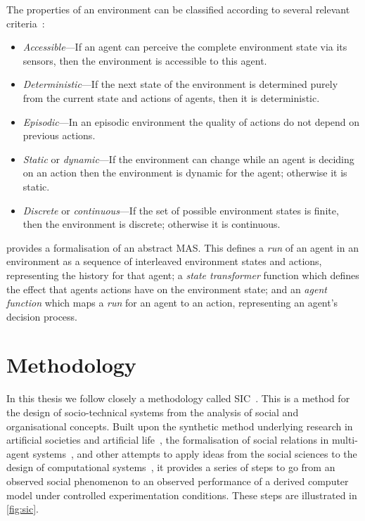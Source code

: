 The properties of an environment can be classified according to several relevant criteria~\citep[p.46]{Russell2003}:
\begin{itemize}
\item \emph{Accessible}---If an agent can perceive the complete environment state via its sensors, then the environment is accessible to this agent.
\item \emph{Deterministic}---If the next state of the environment is determined purely from the current state and actions of agents, then it is deterministic.
\item \emph{Episodic}---In an episodic environment the quality of actions do not depend on previous actions.
\item \emph{Static} or \emph{dynamic}---If the environment can change while an agent is deciding on an action then the environment is dynamic for the agent; otherwise it is static.
\item \emph{Discrete} or \emph{continuous}---If the set of possible environment states is finite, then the environment is discrete; otherwise it is continuous.
\end{itemize}

\citet[pp.31--32]{Wooldridge2002} provides a formalisation of an abstract \ac{MAS}. This defines a \emph{run} of an agent in an environment as a sequence of interleaved environment states and actions, representing the history for that agent; a \emph{state transformer} function which defines the effect that agents actions have on the environment state; and an \emph{agent function} which maps a \emph{run} for an agent to an action, representing an agent's decision process.

\section{Methodology}

In this thesis we follow closely a methodology called \ac{SIC}~\citep{Jones2013}. This is a method for the design of socio-technical systems from the analysis of social and organisational concepts. Built upon the synthetic method underlying research in artificial societies and artificial life~\citep{Steels1994}, the formalisation of social relations in multi-agent systems~\citep{Neville2004}, and other attempts to apply ideas from the social sciences to the design of computational systems~\citep{Edmonds2005}, it provides a series of steps to go from an observed social phenomenon to an observed performance of a derived computer model under controlled experimentation conditions. These steps are illustrated in \autoref{fig:sic}.

